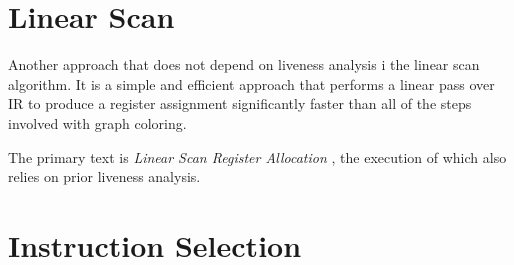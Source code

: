 \documentclass{article}
\begin{document}
\section{Linear Scan}
Another approach that does not depend on liveness analysis i the linear scan algorithm.
It is a simple and efficient approach that performs a linear pass over IR to produce a register assignment significantly faster than all of the steps involved with graph coloring.

The primary text is \textit{Linear Scan Register Allocation} \cite{linear}, the execution of which also relies on prior liveness analysis.


%





%
%
%
%
%
%



\section{Instruction Selection}
\end{document}
